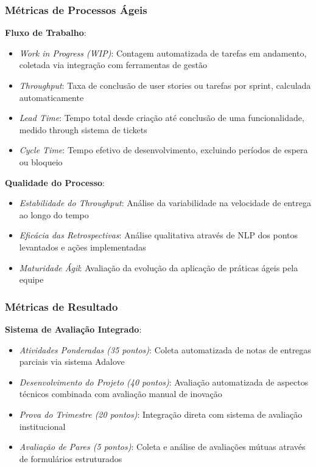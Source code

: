 \documentclass[12pt,a4paper]{article}
\begin{document}
\subsubsection{Métricas de Processos Ágeis}

\textbf{Fluxo de Trabalho}:
\begin{itemize}
\item \textit{Work in Progress (WIP)}: Contagem automatizada de tarefas em andamento, coletada via integração com ferramentas de gestão
\item \textit{Throughput}: Taxa de conclusão de user stories ou tarefas por sprint, calculada automaticamente
\item \textit{Lead Time}: Tempo total desde criação até conclusão de uma funcionalidade, medido through sistema de tickets
\item \textit{Cycle Time}: Tempo efetivo de desenvolvimento, excluindo períodos de espera ou bloqueio
\end{itemize}

\textbf{Qualidade do Processo}:
\begin{itemize}
\item \textit{Estabilidade do Throughput}: Análise da variabilidade na velocidade de entrega ao longo do tempo
\item \textit{Eficácia das Retrospectivas}: Análise qualitativa através de NLP dos pontos levantados e ações implementadas
\item \textit{Maturidade Ágil}: Avaliação da evolução da aplicação de práticas ágeis pela equipe
\end{itemize}

\subsubsection{Métricas de Resultado}

\textbf{Sistema de Avaliação Integrado}:
\begin{itemize}
\item \textit{Atividades Ponderadas (35 pontos)}: Coleta automatizada de notas de entregas parciais via sistema Adalove
\item \textit{Desenvolvimento do Projeto (40 pontos)}: Avaliação automatizada de aspectos técnicos combinada com avaliação manual de inovação
\item \textit{Prova do Trimestre (20 pontos)}: Integração direta com sistema de avaliação institucional
\item \textit{Avaliação de Pares (5 pontos)}: Coleta e análise de avaliações mútuas através de formulários estruturados
\end{itemize}
\end{document}
